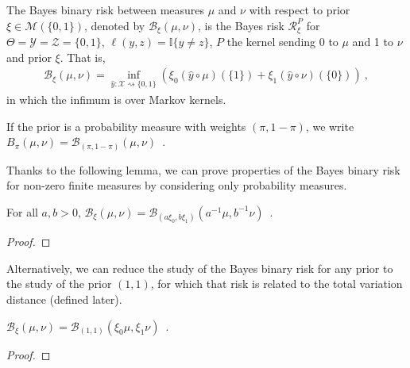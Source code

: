 \begin{definition}
  \label{def:bayesBinaryRisk}
  \leanok
  The Bayes binary risk between measures $\mu$ and $\nu$ with respect to prior $\xi \in \mathcal M(\{0,1\})$, denoted by $\mathcal B_\xi(\mu, \nu)$, is the Bayes risk $\mathcal R^P_\xi$ for $\Theta = \mathcal Y = \mathcal Z = \{0,1\}$, $\ell(y,z) = \mathbb{I}\{y \ne z\}$, $P$ the kernel sending 0 to $\mu$ and 1 to $\nu$ and prior $\xi$.
  That is,
  \begin{align*}
  \mathcal B_\xi(\mu, \nu) = \inf_{\hat{y} : \mathcal X \rightsquigarrow \{0,1\}}\left(\xi_0 (\hat{y} \circ \mu)(\{1\}) + \xi_1 (\hat{y} \circ \nu)(\{0\})\right)
  \: ,
  \end{align*}
  in which the infimum is over Markov kernels.

  If the prior is a probability measure with weights $(\pi, 1 - \pi)$, we write $B_\pi(\mu, \nu) = \mathcal B_{(\pi, 1 - \pi)}(\mu, \nu)$~.
\end{definition}

Thanks to the following lemma, we can prove properties of the Bayes binary risk for non-zero finite measures by considering only probability measures.


\begin{lemma}
  \label{lem:bayesBinaryRisk_mul}
  \leanok
  For all $a, b > 0$, $\mathcal B_\xi(\mu, \nu) = \mathcal B_{(a \xi_0, b \xi_1)}(a^{-1} \mu, b^{-1} \nu)$~.
\end{lemma}

\begin{proof}\leanok
\uses{}

\end{proof}

Alternatively, we can reduce the study of the Bayes binary risk for any prior to the study of the prior $(1, 1)$, for which that risk is related to the total variation distance (defined later).


\begin{lemma}
  \label{lem:bayesBinaryRisk_one_one}
  \leanok
  $\mathcal B_\xi(\mu, \nu) = \mathcal B_{(1,1)}(\xi_0\mu, \xi_1\nu)$~.
\end{lemma}

\begin{proof}\leanok
{}
\end{proof}


